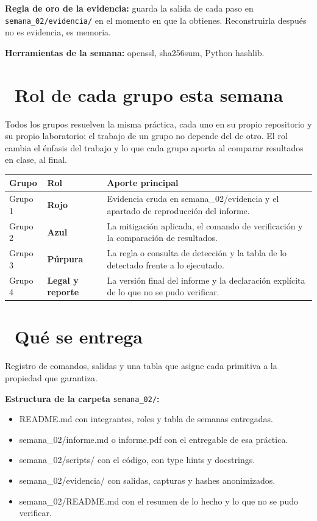 \documentclass[11pt,a4paper]{article}
\newcommand{\iconotexto}[2]{\textcolor{cyanNeon}{\faIcon{#1}}~#2}
\begin{document}
\begin{cajaConcepto}\textbf{Regla de oro de la evidencia:} guarda la salida de cada paso en \texttt{semana\_02/evidencia/} en el momento en que la obtienes. Reconstruirla después no es evidencia, es memoria.
\end{cajaConcepto}

\textbf{Herramientas de la semana:} openssl, sha256sum, Python hashlib.

\section{\iconotexto{users}{Rol de cada grupo esta semana}}

Todos los grupos resuelven la misma práctica, cada uno en su propio repositorio y su propio laboratorio: el trabajo de un grupo no depende del de otro. El rol cambia el énfasis del trabajo y lo que cada grupo aporta al comparar resultados en clase, al final.

\begin{tabularx}{\linewidth}{@{}l l X@{}}
\toprule
Grupo & Rol & Aporte principal\\
\midrule
Grupo 1 & \textbf{Rojo} & Evidencia cruda en semana\_02/evidencia y el apartado de reproducción del informe. \\
Grupo 2 & \textbf{Azul} & La mitigación aplicada, el comando de verificación y la comparación de resultados. \\
Grupo 3 & \textbf{Púrpura} & La regla o consulta de detección y la tabla de lo detectado frente a lo ejecutado. \\
Grupo 4 & \textbf{Legal y reporte} & La versión final del informe y la declaración explícita de lo que no se pudo verificar. \\
\bottomrule
\end{tabularx}

\section{\iconotexto{box-open}{Qué se entrega}}

Registro de comandos, salidas y una tabla que asigne cada primitiva a la propiedad que garantiza.

\textbf{Estructura de la carpeta} \texttt{semana\_02/}\textbf{:}

\begin{itemize}[leftmargin=1.4em,itemsep=2pt,topsep=3pt]
  \item README.md con integrantes, roles y tabla de semanas entregadas.
  \item semana\_02/informe.md o informe.pdf con el entregable de esa práctica.
  \item semana\_02/scripts/ con el código, con type hints y docstrings.
  \item semana\_02/evidencia/ con salidas, capturas y hashes anonimizados.
  \item semana\_02/README.md con el resumen de lo hecho y lo que no se pudo verificar.
\end{itemize}
\end{document}
